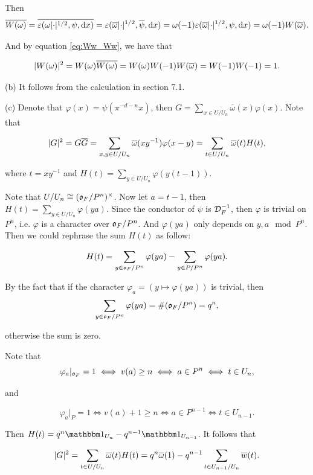 \begin{solution}
  Then
  \[\overline{W({\omega})} = \overline{\varepsilon(\omega \lvert\cdot\rvert^{1/2}, \psi, \mathop{}\!\mathrm{d} x)} =
  \varepsilon(\overline{\omega}\lvert\cdot\rvert^{1/2}, \overline{\psi},\mathop{}\!\mathrm{d} x) =
  \omega(-1) \varepsilon(\overline{\omega} \lvert\cdot\rvert^{1/2}, \psi, \mathop{}\!\mathrm{d} x) =
  \omega(-1) W(\overline{\omega}). \]

  And by equation
  \eqref{eq:Ww_Ww}, we have that

  \[\lvert W(\omega)\rvert^2 = W(\omega) \overline{W(\omega)} = W(\omega) W(-1) W(\overline{\omega}) =
  W(-1) W(-1) = 1.\]

  (b) It follows from the calculation in section 7.1.

  (c) Denote that $\varphi (x) = \psi(\pi ^{-d-n} x)$, then
  $G = \sum_{x \in U/ U_n} \overline{\omega}(x) \varphi(x)$. Note that

  \[\lvert G\rvert^2 = G \overline{G} = \sum_{x, y \in U/ U_n} \overline{\omega}(xy^{-1})\varphi(x - y)
  = \sum_{t \in U/ U_n} \overline{\omega}(t) H(t),\]

  where $t = x y^{-1}$ and $H(t) = \sum_{y \in U/ U_n} \varphi(y(t - 1))$.

  Note that $U/ U_n \cong (\mathfrak{o}_F/ P^n) ^\times$. Now let $a = t - 1$, then
  $H(t) = \sum_{y \in U/ U_n} \varphi(ya)$. Since the conductor of $\psi$ is $\mathcal{D}_F^{-1}$, then
  $\varphi$ is trivial on $P^n$, i.e. $\varphi$ is a character over $\mathfrak{o}_F/ P^n$.
  And $\varphi (y a)$ only depends on $y, a \mod{P^n}$. Then we could rephrase the sum
  $H(t)$ as follow:

  \[H(t) = \sum_{y \in \mathfrak{o}_F/ P^n} \varphi(ya) - \sum_{y \in P/ P ^ n} \varphi(ya).\]

  By the fact that if the character $\varphi_a = (y \mapsto \varphi (ya))$ is trivial,
  then
  \[\sum_{y \in \mathfrak{o}_F/ P^n} \varphi(ya)= \# ({\mathfrak{o}_F/ P^n}) = q ^ n, \]

  otherwise the sum is zero.

  Note that
  \[\varphi_a |_{\mathfrak{o}_F} = 1 \iff v(a) \ge n \iff a \in P^n \iff t \in U_n, \]

  and

  \[\varphi_a |_{P} = 1 \iff v(a) + 1 \ge n \iff a \in P ^{n-1} \iff t \in U_{n - 1}.  \]

  Then $H(t) = q ^ n \bbone_{U_n} - q ^ {n-1} \bbone_{U_{n-1}}$. It follows that

  \[\lvert G\rvert^2 = \sum_{t \in U/ U_n} \overline{\omega}(t) H(t) = q ^ n \overline{\omega} (1) -
    q^{n-1}\sum_{t \in U_{n-1}/ U_n} \overline{w}(t).  \]


\end{solution}
